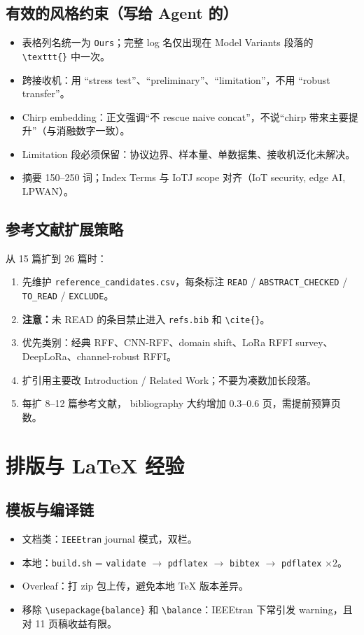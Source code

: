 \documentclass[11pt,a4paper]{ctexart}
\newcommand{\warn}[1]{\textcolor{orange!80!black}{\textbf{注意：}#1}}
\begin{document}
\subsection{有效的风格约束（写给 Agent 的）}
\begin{itemize}
  \item 表格列名统一为 \texttt{Ours}；完整 log 名仅出现在 Model Variants 段落的 \texttt{\textbackslash texttt\{\}} 中一次。
  \item 跨接收机：用 ``stress test''、``preliminary''、``limitation''，不用 ``robust transfer''。
  \item Chirp embedding：正文强调``不 rescue naive concat''，不说``chirp 带来主要提升''（与消融数字一致）。
  \item Limitation 段必须保留：协议边界、样本量、单数据集、接收机泛化未解决。
  \item 摘要 150--250 词；Index Terms 与 IoTJ scope 对齐（IoT security, edge AI, LPWAN）。
\end{itemize}

\subsection{参考文献扩展策略}
从 15 篇扩到 26 篇时：
\begin{enumerate}
  \item 先维护 \texttt{reference\_candidates.csv}，每条标注 \texttt{READ} / \texttt{ABSTRACT\_CHECKED} / \texttt{TO\_READ} / \texttt{EXCLUDE}。
  \item \warn{未 READ 的条目禁止进入 \texttt{refs.bib} 和 \texttt{\textbackslash cite\{\}}。}
  \item 优先类别：经典 RFF、CNN-RFF、domain shift、LoRa RFFI survey、DeepLoRa、channel-robust RFFI。
  \item 扩引用主要改 Introduction / Related Work；不要为凑数加长段落。
  \item 每扩 8--12 篇参考文献， bibliography 大约增加 0.3--0.6 页，需提前预算页数。
\end{enumerate}

\section{排版与 LaTeX 经验}
\label{sec:layout}

\subsection{模板与编译链}
\begin{itemize}
  \item 文档类：\texttt{IEEEtran} journal 模式，双栏。
  \item 本地：\texttt{build.sh} = \texttt{validate} $\to$ \texttt{pdflatex} $\to$ \texttt{bibtex} $\to$ \texttt{pdflatex} $\times 2$。
  \item Overleaf：打 zip 包上传，避免本地 TeX 版本差异。
  \item 移除 \texttt{\textbackslash usepackage\{balance\}} 和 \texttt{\textbackslash balance}：IEEEtran 下常引发 warning，且对 11 页稿收益有限。
\end{itemize}
\end{document}
